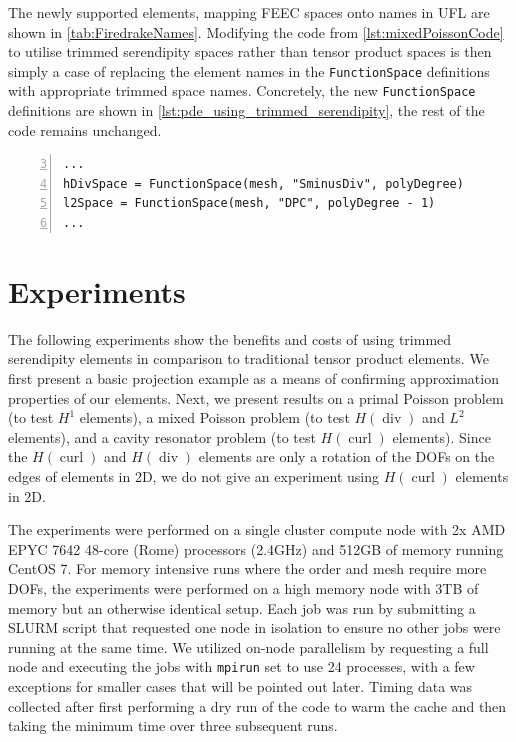 \documentclass[format=acmsmall,screen,timestamp=false,a4paper]{acmart}
\DeclareMathOperator{\Div}{div}
\DeclareMathOperator{\curl}{curl}
\newcommand\josh[1]{\textbf{\textcolor[rgb]{0,.5,1}{[Josh: #1]}}}
\newcommand\lm[1]{\textbf{\textcolor[rgb]{1,0,0.5}{[Lawrence: #1]}}}
\newcommand{\hcurl}{\ensuremath{{H}(\curl)}\xspace}
\newcommand{\hdiv}{\ensuremath{{H}(\Div)}\xspace}
\begin{document}
The newly supported elements, mapping FEEC spaces onto names in UFL are shown in \cref{tab:FiredrakeNames}. Modifying the code from \cref{lst:mixedPoissonCode} to utilise trimmed serendipity spaces rather than tensor product spaces is then simply a case of replacing the element names in the \texttt{FunctionSpace} definitions with appropriate trimmed space names. Concretely, the new \texttt{FunctionSpace} definitions are shown in \cref{lst:pde_using_trimmed_serendipity}, the rest of the code remains unchanged.
\begin{lstlisting}[float=htbp,caption={Setting up Firedrake to use the trimmed serendipity elements in a mixed Poisson problem in 3D.}, label={lst:pde_using_trimmed_serendipity}, numbers=left, firstnumber=3, xleftmargin=20pt,  xrightmargin=20pt]
...
hDivSpace = FunctionSpace(mesh, "SminusDiv", polyDegree)
l2Space = FunctionSpace(mesh, "DPC", polyDegree - 1)
...
\end{lstlisting}
 


  \section{Experiments}
    
The following experiments show the benefits and costs of using trimmed serendipity elements in comparison to traditional tensor product elements.  We first present a basic projection example as a means of confirming approximation properties of our elements.  Next, we present results on a primal Poisson problem (to test $H^1$ elements), a mixed Poisson problem (to test \hdiv and $L^2$ elements), and a cavity resonator problem (to test \hcurl elements).  Since the \hcurl and \hdiv elements are only a rotation of the DOFs on the edges of elements in 2D, we do not give an experiment using \hcurl elements in 2D. 

The experiments were performed on a single cluster compute node with 2x AMD EPYC 7642 48-core (Rome) processors (2.4GHz) and 512GB of memory running CentOS 7.  For memory intensive runs where the order and mesh require more DOFs, the experiments were performed on a high memory node with 3TB of memory but an otherwise identical setup.  Each job was run by submitting a SLURM script that requested one node in isolation to ensure no other jobs were running at the same time.  We utilized on-node parallelism by requesting a full node and executing the jobs with \texttt{mpirun} set to use 24 processes, with a few exceptions for smaller cases that will be pointed out later.  Timing data was collected after first performing a dry run of the code to warm the cache and then taking the minimum time over three subsequent runs.  
\end{document}
